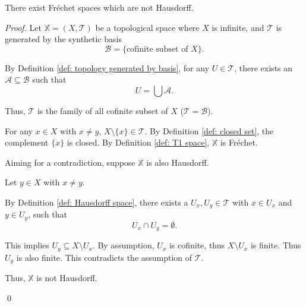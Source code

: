 \begin{proposition}
	There exist Fr\'echet spaces which are not Hausdorff.
	
	\begin{proof}
		Let $\mathbb X = (X, \mathcal T)$ be a topological space where $X$ is infinite, and $\mathcal T$ is generated by the synthetic basis
		$$
		\mathcal B = \{ \text{cofinite subset of $X$} \}.
		$$
		
		By Definition \ref{def: topology generated by basis}, for any $U \in \mathcal T$, there exists an $\mathcal A \subseteq \mathcal B$ such that
		$$
		U = \bigcup \mathcal A.
		$$
		
		Thus, $\mathcal T$ is the family of all cofinite subset of $X$ ($\mathcal T = \mathcal B$).
		
		For any $x \in X$ with $x \ne y$, $X \setminus \{x\} \in \mathcal T$. By Definition \ref{def: closed set}, the complement $\{x\}$ is closed. By Definition \ref{def: T1 space}, $\mathbb X$ is Fr\'echet.
		
		Aiming for a contradiction, suppose $\mathbb X$ is also Hausdorff.
		
		Let $y \in X$ with $x \ne y$.
		
		By Definition \ref{def: Hausdorff space}, there exists a $U_x,U_y \in \mathcal T$ with $x \in U_x$ and $y \in U_y$, such that
		$$
		U_x \cap U_y = \emptyset.
		$$
		
		This implies $U_y \subseteq X \setminus U_x$. By assumption, $U_x$ is cofinite, thus $X \setminus U_x$ is finite. Thus $U_y$ is also finite. This contradicts the assumption of $\mathcal T$.
		
		Thus, $\mathbb X$ is not Hausdorff.
		
		\qed
	\end{proof}
\end{proposition}


